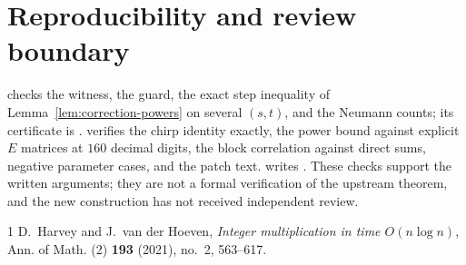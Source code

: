 \documentclass[11pt]{article}
\begin{document}
\section{Reproducibility and review boundary}
 checks the witness, the guard, the exact
step inequality of Lemma~\ref{lem:correction-powers} on several $(s,t)$, and the
Neumann counts; its certificate is .
 verifies the chirp identity exactly, the
power bound against explicit $E$ matrices at $160$ decimal digits, the block
correlation against direct sums, negative parameter cases, and the patch
text.  writes
. These checks support the written
arguments; they are not a formal verification of the upstream theorem, and
the new construction has not received independent review.

\begin{thebibliography}{1}
D.~Harvey and J.~van der Hoeven, \emph{Integer multiplication in time
$O(n\log n)$}, Ann. of Math. (2) \textbf{193} (2021), no.~2, 563--617.
\end{thebibliography}
\end{document}
